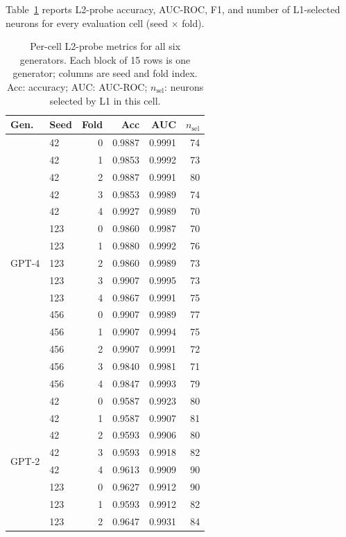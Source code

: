 \documentclass[11pt]{article}
\begin{document}
Table~\ref{tab:per-cell} reports L2-probe accuracy, AUC-ROC, F1, and number of L1-selected neurons for every evaluation cell (seed $\times$ fold).

\begin{table}[!htbp]
\centering
\footnotesize
\caption{Per-cell L2-probe metrics for all six generators. Each block of 15 rows is one generator; columns are seed and fold index. Acc: accuracy; AUC: AUC-ROC; $n_{\text{sel}}$: neurons selected by L1 in this cell.}
\label{tab:per-cell}
\begin{minipage}[t]{0.48\textwidth}
\centering
\begin{tabular}{llrrrr}
\toprule
Gen. & Seed & Fold & Acc & AUC & $n_{\text{sel}}$ \\
\midrule
\multirow{15}{*}{GPT-4}
 & 42  & 0 & 0.9887 & 0.9991 & 74 \\
 & 42  & 1 & 0.9853 & 0.9992 & 73 \\
 & 42  & 2 & 0.9887 & 0.9991 & 80 \\
 & 42  & 3 & 0.9853 & 0.9989 & 74 \\
 & 42  & 4 & 0.9927 & 0.9989 & 70 \\
 & 123 & 0 & 0.9860 & 0.9987 & 70 \\
 & 123 & 1 & 0.9880 & 0.9992 & 76 \\
 & 123 & 2 & 0.9860 & 0.9989 & 73 \\
 & 123 & 3 & 0.9907 & 0.9995 & 73 \\
 & 123 & 4 & 0.9867 & 0.9991 & 75 \\
 & 456 & 0 & 0.9907 & 0.9989 & 77 \\
 & 456 & 1 & 0.9907 & 0.9994 & 75 \\
 & 456 & 2 & 0.9907 & 0.9991 & 72 \\
 & 456 & 3 & 0.9840 & 0.9981 & 71 \\
 & 456 & 4 & 0.9847 & 0.9993 & 79 \\
\midrule
\multirow{15}{*}{GPT-2}
 & 42  & 0 & 0.9587 & 0.9923 & 80 \\
 & 42  & 1 & 0.9587 & 0.9907 & 81 \\
 & 42  & 2 & 0.9593 & 0.9906 & 80 \\
 & 42  & 3 & 0.9593 & 0.9918 & 82 \\
 & 42  & 4 & 0.9613 & 0.9909 & 90 \\
 & 123 & 0 & 0.9627 & 0.9912 & 90 \\
 & 123 & 1 & 0.9593 & 0.9912 & 82 \\
 & 123 & 2 & 0.9647 & 0.9931 & 84 \\

\end{tabular}
\end{minipage}
\end{table}
\end{document}
